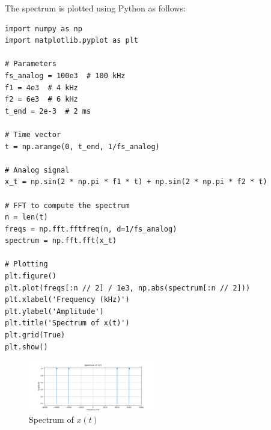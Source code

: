 
\item[(a)]
The spectrum is plotted using Python as follows:

\begin{verbatim}
import numpy as np
import matplotlib.pyplot as plt

# Parameters
fs_analog = 100e3  # 100 kHz
f1 = 4e3  # 4 kHz
f2 = 6e3  # 6 kHz
t_end = 2e-3  # 2 ms

# Time vector
t = np.arange(0, t_end, 1/fs_analog)

# Analog signal
x_t = np.sin(2 * np.pi * f1 * t) + np.sin(2 * np.pi * f2 * t)

# FFT to compute the spectrum
n = len(t)
freqs = np.fft.fftfreq(n, d=1/fs_analog)
spectrum = np.fft.fft(x_t)

# Plotting
plt.figure()
plt.plot(freqs[:n // 2] / 1e3, np.abs(spectrum[:n // 2]))
plt.xlabel('Frequency (kHz)')
plt.ylabel('Amplitude')
plt.title('Spectrum of x(t)')
plt.grid(True)
plt.show()
\end{verbatim}

\begin{figure}[h]
    \centering
    \includegraphics[width=0.49\textwidth]{fig/ex1_a_plot}
    \caption{Spectrum of \(x(t)\)}
    \label{fig:ex1_a_plot}
\end{figure}

